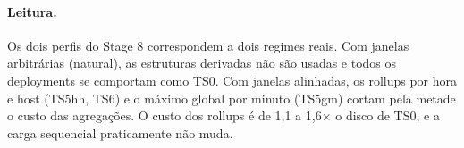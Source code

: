 \paragraph{Leitura.} Os dois perfis do Stage 8 correspondem a dois regimes reais. Com janelas arbitrárias (natural), as estruturas derivadas não são usadas e todos os deployments se comportam como TS0. Com janelas alinhadas, os rollups por hora e host (TS5hh, TS6) e o máximo global por minuto (TS5gm) cortam pela metade o custo das agregações. O custo dos rollups é de 1,1 a 1,6$\times$ o disco de TS0, e a carga sequencial praticamente não muda.
